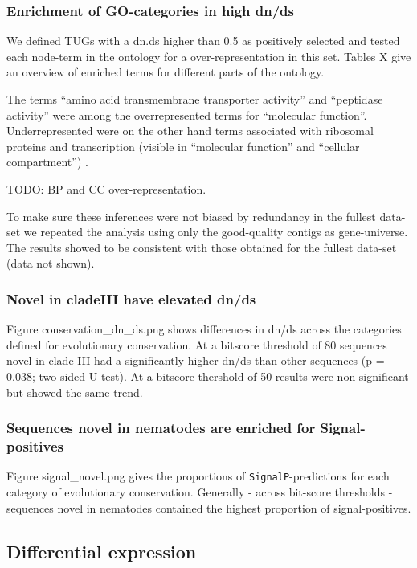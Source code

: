 \documentclass[10pt]{bmc_article}
\newenvironment{bmcformat}{\begin{raggedright}\baselineskip20pt\sloppy\setboolean{publ}{false}}{\end{raggedright}\baselineskip20pt\sloppy}
\begin{document}
\begin{bmcformat}
\subsubsection*{Enrichment of GO-categories in high dn/ds}

We defined TUGs with a dn.ds higher than 0.5 as positively selected
and tested each node-term in the ontology for a over-representation in
this set. Tables X give an overview of enriched terms for different
parts of the ontology.

The terms ``amino acid transmembrane transporter activity'' and
``peptidase activity'' were among the overrepresented terms for
``molecular function''. Underrepresented were on the other hand terms
associated with ribosomal proteins and transcription (visible in
``molecular function'' and ``cellular compartment'') .

TODO: BP and CC over-representation. 

To make sure these inferences were not biased by redundancy in the
fullest data-set we repeated the analysis using only the good-quality
contigs as gene-universe. The results showed to be consistent with
those obtained for the fullest data-set (data not shown).

\subsubsection*{Novel in cladeIII have elevated dn/ds}

Figure conservation\_dn\_ds.png shows differences in dn/ds across the
categories defined for evolutionary conservation. At a bitscore
threshold of 80 sequences novel in clade III had a significantly
higher dn/ds than other sequences (p =
0.038; two sided U-test). At a
bitscore thershold of 50 results were non-significant but showed the
same trend.

\subsubsection*{Sequences novel in nematodes are enriched for
  Signal-positives}

Figure signal\_novel.png gives the proportions of
\texttt{SignalP}-predictions for each category of evolutionary
conservation. Generally - across bit-score thresholds - sequences
novel in nematodes contained the highest proportion of
signal-positives.

\subsection*{Differential expression}
                


\end{bmcformat}
\end{document}
